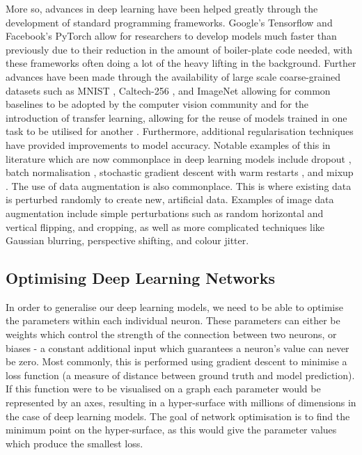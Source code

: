 More so, advances in deep learning have been helped greatly through the development of standard programming frameworks. Google's Tensorflow \cite{abadi_tensorflow:_2016} and Facebook's PyTorch \cite{paszke_automatic_2017} allow for researchers to develop models much faster than previously due to their reduction in the amount of boiler-plate code needed, with these frameworks often doing a lot of the heavy lifting in the background. Further advances have been made through the availability of large scale coarse-grained datasets such as MNIST \cite{lecun_gradient-based_1998}, Caltech-256 \cite{griffin_caltech-256_2007}, and ImageNet \cite{deng_imagenet:_2009} allowing for common baselines to be adopted by the computer vision community and for the introduction of transfer learning, allowing for the reuse of models trained in one task to be utilised for another \cite{pan_survey_2010}. Furthermore, additional regularisation techniques have provided improvements to model accuracy. Notable examples of this in literature which are now commonplace in deep learning models include dropout \cite{srivastava_dropout:_2014}, batch normalisation \cite{ioffe_batch_2015}, stochastic gradient descent with warm restarts \cite{loshchilov_sgdr:_2016}, and mixup \cite{zhang_mixup:_2017}. The use of data augmentation is also commonplace. This is where existing data is perturbed randomly to create new, artificial data. Examples of image data augmentation include simple perturbations such as random horizontal and vertical flipping, and cropping, as well as more complicated techniques like Gaussian blurring, perspective shifting, and colour jitter.

\subsection{Optimising Deep Learning Networks}\label{ch:Background,sec:DLIntro,sub:stochasticgradientdescent}

In order to generalise our deep learning models, we need to be able to optimise the parameters within each individual neuron. These parameters can either be weights which control the strength of the connection between two neurons, or biases - a constant additional input which guarantees a neuron's value can never be zero. Most commonly, this is performed using gradient descent to minimise a loss function (a measure of distance between ground truth and model prediction). If this function were to be visualised on a graph each parameter would be represented by an axes, resulting in a hyper-surface with millions of dimensions in the case of deep learning models. The goal of network optimisation is to find the minimum point on the hyper-surface, as this would give the parameter values which produce the smallest loss. 

